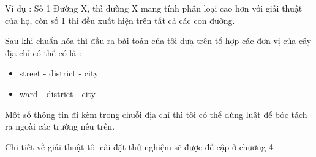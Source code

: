 Ví dụ : Số 1 Đường X, thì đường X mang tính phân loại cao hơn với giải thuật của họ, còn số 1 thì đều xuất hiện trên tất cả các con đường. 

Sau khi chuẩn hóa thì đầu ra bài toán của tôi dưạ trên tổ hợp các đơn vị của cây địa chỉ có thể có là :

\begin{itemize}
    \item street - district - city
    \item ward - district - city
\end{itemize}

Một số thông tin đi kèm trong chuỗi địa chỉ thì tôi có thể dùng luật để bóc tách ra ngoài các trường nêu trên.

Chi tiết về giải thuật tôi cài đặt thử nghiệm sẽ được đề cập ở chương 4.
